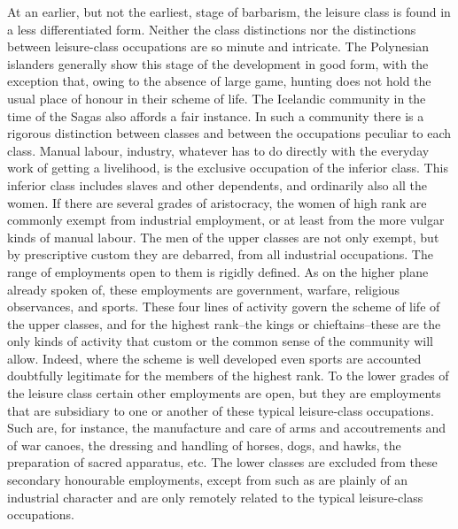 \documentclass[12pt]{report}
\begin{document}
At an earlier, but not the earliest, stage of barbarism, the leisure
class is found in a less differentiated form. Neither the class
distinctions nor the distinctions between leisure-class occupations are
so minute and intricate. The Polynesian islanders generally show this
stage of the development in good form, with the exception that, owing
to the absence of large game, hunting does not hold the usual place of
honour in their scheme of life. The Icelandic community in the time of
the Sagas also affords a fair instance. In such a community there is
a rigorous distinction between classes and between the occupations
peculiar to each class. Manual labour, industry, whatever has to
do directly with the everyday work of getting a livelihood, is the
exclusive occupation of the inferior class. This inferior class includes
slaves and other dependents, and ordinarily also all the women. If there
are several grades of aristocracy, the women of high rank are commonly
exempt from industrial employment, or at least from the more vulgar
kinds of manual labour. The men of the upper classes are not only
exempt, but by prescriptive custom they are debarred, from all
industrial occupations. The range of employments open to them is rigidly
defined. As on the higher plane already spoken of, these employments are
government, warfare, religious observances, and sports. These four lines
of activity govern the scheme of life of the upper classes, and for
the highest rank--the kings or chieftains--these are the only kinds of
activity that custom or the common sense of the community will allow.
Indeed, where the scheme is well developed even sports are accounted
doubtfully legitimate for the members of the highest rank. To the lower
grades of the leisure class certain other employments are open, but they
are employments that are subsidiary to one or another of these typical
leisure-class occupations. Such are, for instance, the manufacture
and care of arms and accoutrements and of war canoes, the dressing
and handling of horses, dogs, and hawks, the preparation of sacred
apparatus, etc. The lower classes are excluded from these secondary
honourable employments, except from such as are plainly of an industrial
character and are only remotely related to the typical leisure-class
occupations.
\end{document}
